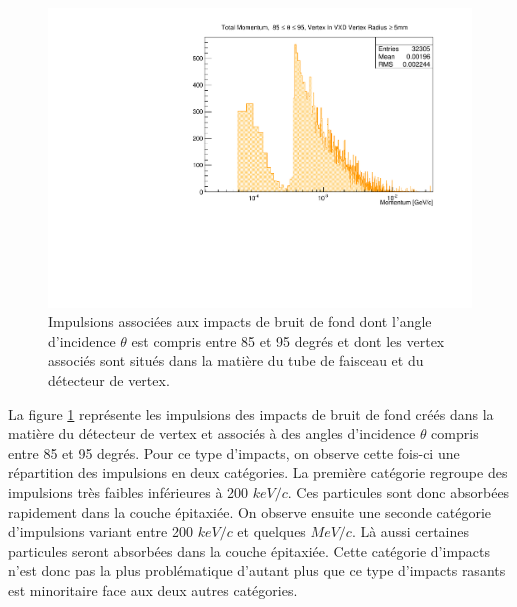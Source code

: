   \medskip
  
  \begin{figure}[!htb]
    \begin{center}
      \includegraphics[scale=0.50]{./figures/Track_Tilts_Beamstrahlung/beamstrahlung_Theta/totalMomentum_theta_85_95_VertexInVXD_R_sup_5mm.pdf}
      \caption{Impulsions associ\'ees aux impacts de bruit de fond dont l'angle d'incidence $\theta$ est compris entre 85 et 95 degr\'es et dont les vertex associ\'es sont situ\'es dans la mati\`ere du tube de faisceau et du d\'etecteur de vertex.}
      \label{fig:P_Theta_theta85_95_in_VXD}
    \end{center}
  \end{figure}
  
  La figure \ref{fig:P_Theta_theta85_95_in_VXD} repr\'esente les impulsions des impacts de bruit de fond cr\'e\'es dans la mati\`ere du détecteur de vertex et associ\'es \`a des angles d'incidence $\theta$ compris entre 85 et 95 degr\'es. Pour ce type d'impacts, on observe cette fois-ci une r\'epartition des impulsions en deux cat\'egories. La premi\`ere cat\'egorie regroupe des impulsions tr\`es faibles inf\'erieures \`a 200 $keV/c$. Ces particules sont donc absorb\'ees rapidement dans la couche \'epitaxi\'ee. On observe ensuite une seconde cat\'egorie d'impulsions variant entre 200 $keV/c$ et quelques $MeV/c$. Là aussi certaines particules seront absorb\'ees dans la couche \'epitaxi\'ee. Cette cat\'egorie d'impacts n'est donc pas la plus probl\'ematique d'autant plus que ce type d'impacts rasants est minoritaire face aux deux autres cat\'egories.
  
  \medskip

